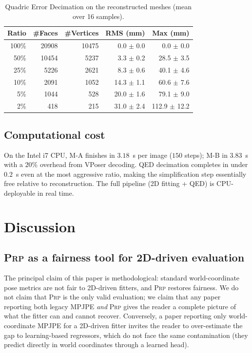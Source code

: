 \documentclass[twocolumn,10pt]{svjour3}
\newcommand{\methodA}{\textsc{M-A}}
\newcommand{\methodB}{\textsc{M-B}}
\newcommand{\prp}{\textsc{Prp}}
\begin{document}
\begin{table}[htbp]
\centering
\caption{Quadric Error Decimation on the reconstructed meshes (mean over 16 samples).}
\label{tab:qed}
\begin{tabular}{r r r r r}
\toprule
Ratio & \#Faces & \#Vertices & RMS (mm) & Max (mm)\\
\midrule
100\% & 20908 & 10475 & 0.0 $\pm$ 0.0  & 0.0 $\pm$ 0.0 \\
50\%  & 10454 &  5237 & 3.3 $\pm$ 0.2  & 28.5 $\pm$ 3.5 \\
25\%  &  5226 &  2621 & 8.3 $\pm$ 0.6  & 40.1 $\pm$ 4.6 \\
10\%  &  2091 &  1052 & 14.3 $\pm$ 1.1 & 60.6 $\pm$ 7.6 \\
5\%   &  1044 &   528 & 20.0 $\pm$ 1.6 & 79.1 $\pm$ 9.0 \\
2\%   &   418 &   215 & 31.0 $\pm$ 2.4 & 112.9 $\pm$ 12.2 \\
\bottomrule
\end{tabular}
\end{table}

\subsection{Computational cost}
On the Intel i7 CPU, \methodA{} finishes in $3.18$~s per image ($150$ steps); \methodB{} in $3.83$~s with a $20\%$ overhead from VPoser decoding. QED decimation completes in under $0.2$~s even at the most aggressive ratio, making the simplification step essentially free relative to reconstruction. The full pipeline (2D fitting + QED) is CPU-deployable in real time.

\section{Discussion}
\label{sec:discussion}

\subsection{\prp{} as a fairness tool for 2D-driven evaluation}
The principal claim of this paper is methodological: standard world-coordinate pose metrics are not fair to 2D-driven fitters, and \prp{} restores fairness. We do not claim that \prp{} is the only valid evaluation; we claim that any paper reporting both legacy MPJPE \emph{and} \prp{} gives the reader a complete picture of what the fitter can and cannot recover. Conversely, a paper reporting only world-coordinate MPJPE for a 2D-driven fitter invites the reader to over-estimate the gap to learning-based regressors, which do not face the same contamination (they predict directly in world coordinates through a learned head).
\end{document}
